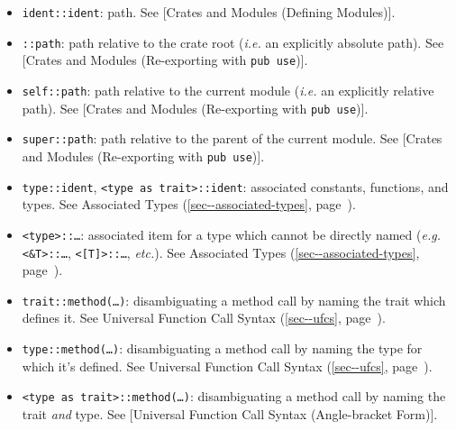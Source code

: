 \documentclass[a4paper,]{book}
\renewcommand*{\hyperlink}[2]{%
 #2 (\autoref{#1}, page~\pageref{#1})}
\providecommand{\tightlist}{%
  \setlength{\itemsep}{0pt}\setlength{\parskip}{0pt}}
\begin{document}
\begin{itemize}
\tightlist
\item
  \texttt{ident::ident}: path. See {[}Crates and Modules (Defining
  Modules){]}.
\item
  \texttt{::path}: path relative to the crate root (\emph{i.e.} an
  explicitly absolute path). See {[}Crates and Modules (Re-exporting
  with \texttt{pub\ use}){]}.
\item
  \texttt{self::path}: path relative to the current module (\emph{i.e.}
  an explicitly relative path). See {[}Crates and Modules (Re-exporting
  with \texttt{pub\ use}){]}.
\item
  \texttt{super::path}: path relative to the parent of the current
  module. See {[}Crates and Modules (Re-exporting with
  \texttt{pub\ use}){]}.
\item
  \texttt{type::ident},
  \texttt{\textless{}type\ as\ trait\textgreater{}::ident}: associated
  constants, functions, and types. See
  \protect\hyperlink{sec--associated-types}{Associated Types}.
\item
  \texttt{\textless{}type\textgreater{}::\ldots{}}: associated item for
  a type which cannot be directly named (\emph{e.g.}
  \texttt{\textless{}\&T\textgreater{}::\ldots{}},
  \texttt{\textless{}{[}T{]}\textgreater{}::\ldots{}}, \emph{etc.}). See
  \protect\hyperlink{sec--associated-types}{Associated Types}.
\item
  \texttt{trait::method(\ldots{})}: disambiguating a method call by
  naming the trait which defines it. See
  \protect\hyperlink{sec--ufcs}{Universal Function Call Syntax}.
\item
  \texttt{type::method(\ldots{})}: disambiguating a method call by
  naming the type for which it's defined. See
  \protect\hyperlink{sec--ufcs}{Universal Function Call Syntax}.
\item
  \texttt{\textless{}type\ as\ trait\textgreater{}::method(\ldots{})}:
  disambiguating a method call by naming the trait \emph{and} type. See
  {[}Universal Function Call Syntax (Angle-bracket Form){]}.
\end{itemize}
\end{document}
